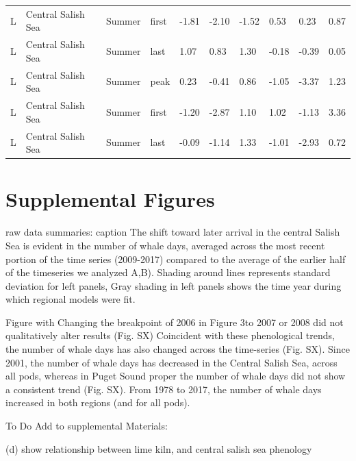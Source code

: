 \documentclass{article}
\begin{document}
\begin{table}[ht]
\begin{tabular}{|p{}|p{}|p{}|p{}|p{}p{}p{}|p{}p{}p{}|}
  L & Central Salish Sea & Summer & first & -1.81 & -2.10 & -1.52 & 0.53 & 0.23 & 0.87 \\ 
  L & Central Salish Sea & Summer & last & 1.07 & 0.83 & 1.30 & -0.18 & -0.39 & 0.05 \\ 
  L & Central Salish Sea & Summer & peak & 0.23 & -0.41 & 0.86 & -1.05 & -3.37 & 1.23 \\ 
  L & Central Salish Sea & Summer & first & -1.20 & -2.87 & 1.10 & 1.02 & -1.13 & 3.36 \\ 
  L & Central Salish Sea & Summer & last & -0.09 & -1.14 & 1.33 & -1.01 & -2.93 & 0.72 \\ 
  \end{tabular}
\endgroup
\end{table}




\section* {Supplemental Figures}

\par raw data summaries: caption The shift toward later arrival in the central Salish Sea is evident in the number of whale days, averaged across the most recent portion of the time series (2009-2017) compared to the average of the earlier half of the timeseries we analyzed  A,B).  Shading around lines represents standard deviation for left panels, Gray shading in left panels shows the time year during which regional models were fit.


\par Figure with Changing the breakpoint of 2006 in Figure 3to 2007 or 2008 did not qualitatively alter results (Fig. SX)
Coincident with these phenological trends, the number of whale days has also changed across the time-series (Fig. SX). Since 2001, the number of whale days has decreased in the Central Salish Sea, across all pods, whereas in Puget Sound proper the number of whale days did not show a consistent trend (Fig. SX). From 1978 to 2017, the number of whale days increased in both regions (and for all pods). 
\par To Do 
Add to supplemental Materials: 

(d) show relationship between lime kiln, and central salish sea phenology
\end{document}
